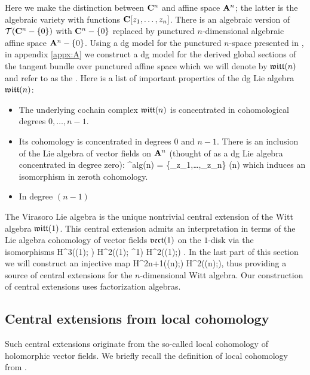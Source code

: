 \documentclass[11pt]{amsart}
\begin{document}
Here we make the distinction between $\mathbf{C}^n$ and affine space ${\mathbf{A}}^n$; the latter is the algebraic variety with functions $\mathbf{C}[z_1,\ldots,z_n]$.
There is an algebraic version of $\mathcal T(\mathbf{C}^n - \{0\})$ with $\mathbf{C}^n - \{0\}$ replaced by punctured $n$-dimensional algebraic affine space ${\mathbf{A}}^n - \{0\}$.
Using a dg model for the punctured $n$-space presented in \cite{FHK}, in appendix \ref{appx:A} we construct a dg model for the derived global sections of the tangent bundle over punctured affine space which we will denote by $\mathfrak{witt}(n)$ and refer to as the .
Here is a list of important properties of the dg Lie algebra $\mathfrak{witt}(n)$:
\begin{itemize}
\item The underlying cochain complex $\mathfrak{witt}(n)$ is concentrated in cohomological degrees $0,\ldots,n-1$.
\item Its cohomology is concentrated in degrees $0$ and $n-1$.
There is an inclusion of the Lie algebra of vector fields on ${\mathbf{A}}^n$ (thought of as a dg Lie algebra concentrated in degree zero):
\beqn
{}^{alg}(n) = \C[z_1,\ldots,z_n]\{\del_{z_1},\ldots,\del_{z_n}\} \hookrightarrow 
{}(n)
\eeqn
which induces an isomorphism in zeroth cohomology.
\item In degree $(n-1)$ 
\end{itemize}

The Virasoro Lie algebra is the unique nontrivial central extension of the Witt algebra $\mathfrak{witt}(1)$.
This central extension admits an interpretation in terms of the Lie algebra cohomology of  vector fields $\mathfrak{vect}(1)$ on the $1$-disk via the isomorphisms
\beqn
H^3((1); \C) \cong H^2((1); \Omega^1) \cong H^2((1);\C) \cong \C .
\eeqn
In the last part of this section we will construct an injective map
\beqn
H^{2n+1}((n);\C) \to H^2((n);\C), 
\eeqn
thus providing a source of central extensions for the $n$-dimensional Witt algebra.
Our construction of central extensions uses factorization algebras.

\subsection{Central extensions from local cohomology}

Such central extensions originate from the so-called local cohomology of holomorphic vector fields.
We briefly recall the definition of local cohomology from \cite{CG2}.
\end{document}
